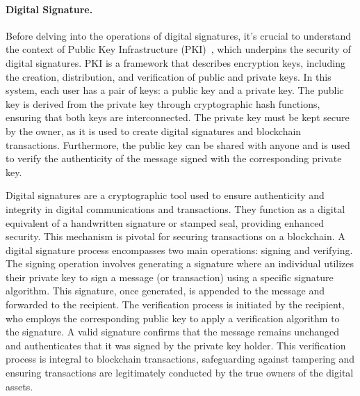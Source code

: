 \paragraph{Digital Signature.}\label{digital_signature}
Before delving into the operations of digital signatures, it's crucial to understand the context of Public Key Infrastructure (PKI)~\cite{adams1999understanding}, which underpins the security of digital signatures. PKI is a framework that describes encryption keys, including the creation, distribution, and verification of public and private keys. In this system, each user has a pair of keys: a public key and a private key. The public key is derived from the private key through cryptographic hash functions, ensuring that both keys are interconnected. The private key must be kept secure by the owner, as it is used to create digital signatures and blockchain transactions. Furthermore, the public key can be shared with anyone and is used to verify the authenticity of the message signed with the corresponding private key.

Digital signatures are a cryptographic tool used to ensure authenticity and integrity in digital communications and transactions. They function as a digital equivalent of a handwritten signature or stamped seal, providing enhanced security. This mechanism is pivotal for securing transactions on a blockchain. A digital signature process encompasses two main operations: signing and verifying. The signing operation involves generating a signature where an individual utilizes their private key to sign a message (or transaction) using a specific signature algorithm. This signature, once generated, is appended to the message and forwarded to the recipient. The verification process is initiated by the recipient, who employs the corresponding public key to apply a verification algorithm to the signature. A valid signature confirms that the message remains unchanged and authenticates that it was signed by the private key holder. This verification process is integral to blockchain transactions, safeguarding against tampering and ensuring transactions are legitimately conducted by the true owners of the digital assets.






